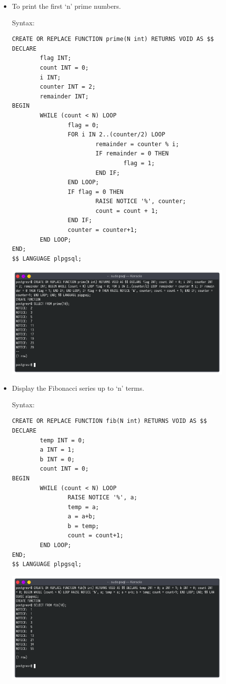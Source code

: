 \documentclass[13pt,oneside]{book}
\begin{document}
\begin{itemize}
\item
To print the first `n' prime numbers.
 
 
Syntax:
\begin{verbatim}
CREATE OR REPLACE FUNCTION prime(N int) RETURNS VOID AS $$
DECLARE
        flag INT;
        count INT = 0;
        i INT;
        counter INT = 2;
        remainder INT;
BEGIN
        WHILE (count < N) LOOP
                flag = 0;
                FOR i IN 2..(counter/2) LOOP
                        remainder = counter % i;
                        IF remainder = 0 THEN
                                flag = 1;
                        END IF;
                END LOOP;
                IF flag = 0 THEN
                        RAISE NOTICE '%', counter;
                        count = count + 1;
                END IF;
                counter = counter+1;
        END LOOP;
END;
$$ LANGUAGE plpgsql;

\end{verbatim}
\includegraphics[width=0.9\textwidth]{img/p9/ss1.png}


\item
Display the Fibonacci series up to `n' terms.
 
 
Syntax:
\begin{verbatim}
CREATE OR REPLACE FUNCTION fib(N int) RETURNS VOID AS $$ 
DECLARE
        temp INT = 0;
        a INT = 1;
        b INT = 0;
        count INT = 0;
BEGIN
        WHILE (count < N) LOOP
                RAISE NOTICE '%', a;
                temp = a;
                a = a+b;
                b = temp;
                count = count+1;
        END LOOP;
END;
$$ LANGUAGE plpgsql;

\end{verbatim}
\includegraphics[width=0.9\textwidth]{img/p9/ss2.png}



\end{itemize}
\end{document}
